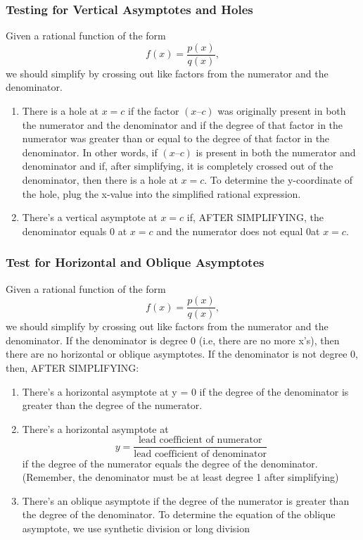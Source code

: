 \documentclass{article}
\begin{document}
\subsubsection{Testing for Vertical Asymptotes and Holes} 
Given a rational function of the form $$f(x)=\frac{p(x)}{q(x)},$$ we should simplify by crossing out like factors from the numerator and the denominator. 
\begin{enumerate}
    \item There is a hole at $x = c$ if the factor $(x –c)$ was originally present in both the numerator and the denominator and if the degree of that factor in the numerator was greater than or equal to the degree of that factor in the denominator. In other words, if $(x –c)$ is present in both the numerator and denominator and if, after simplifying, it is completely crossed out of the denominator, then there is a hole at  $x = c$. To determine the y-coordinate of the hole, plug the x-value into the simplified rational expression.
    \item There’s a vertical asymptote at $x = c$ if, AFTER SIMPLIFYING, the denominator equals 0 at $x = c$ and the numerator does not equal 0at $x = c$.
\end{enumerate}

\subsubsection{Test for Horizontal and Oblique Asymptotes}
Given a rational function of the form $$f(x)=\frac{p(x)}{q(x)},$$ we should simplify by crossing out like factors from the numerator and the denominator. If the denominator is degree 0 (i.e, there are no more x’s), then there are no horizontal or oblique asymptotes. If the denominator is not degree 0, then, AFTER SIMPLIFYING:
\begin{enumerate}
    \item There’s a horizontal asymptote at y = 0 if the degree of the denominator is greater than the degree of the numerator.
    \item There’s a horizontal asymptote at $$y=\frac{\text{lead coefficient of numerator}}{\text{lead coefficient of denominator}}$$ if the degree of the numerator equals the degree of the denominator. (Remember, the denominator must be at least degree 1 after simplifying)
    \item There’s an oblique asymptote if the degree of the numerator is greater than the degree of the denominator.  To determine the equation of the oblique asymptote, we use synthetic division or long division
\end{enumerate}
\end{document}
